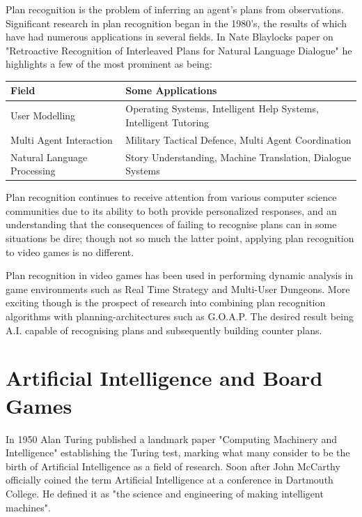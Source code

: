 \documentclass[parskip]{cs4rep}
\begin{document}
Plan recognition is the problem of inferring an agent's plans from observations. Significant research in plan recognition began in the 1980's, the results of which have had numerous applications in several fields. In Nate Blaylocks paper on "Retroactive Recognition of Interleaved Plans for Natural Language Dialogue" \cite{oai:CiteSeerPSU:538953} he highlights a few of the most prominent as being:

\begin{tabular}{|l|p{8cm}|}
\hline 
\textbf{Field} & \textbf{Some Applications} \\ 
\hline 
User Modelling & Operating Systems, Intelligent Help Systems, Intelligent Tutoring \\ 
\hline 
Multi Agent Interaction & Military Tactical Defence, Multi Agent Coordination \\ 
\hline 
Natural Language Processing & Story Understanding, Machine Translation, Dialogue Systems \\ 
\hline
\end{tabular} 

Plan recognition continues to receive attention from various computer science communities due to its ability to both provide personalized responses, and an understanding that the consequences of failing to recognise plans can in some situations be dire; though not so much the latter point, applying plan recognition to video games is no different.

Plan recognition in video games has been used in performing dynamic analysis in game environments such as Real Time Strategy \cite{conf/aiide/SynnaeveB11} and Multi-User Dungeons\cite{Albrecht:1998:BMK:598277.598308}. More exciting though is the prospect of research into combining plan recognition algorithms with planning-architectures such as G.O.A.P. The desired result being A.I. capable of recognising plans and subsequently building counter plans.

\section{Artificial Intelligence and Board Games}

In 1950 Alan Turing published a landmark paper "Computing Machinery and Intelligence" establishing the Turing test, marking what many consider to be the birth of Artificial Intelligence as a field of research. Soon after John McCarthy officially coined the term Artificial Intelligence at a conference in Dartmouth College. He defined it as "the science and engineering of making intelligent machines".
\end{document}
